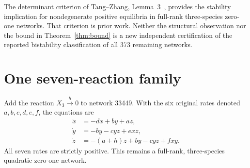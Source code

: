 \documentclass[11pt,a4paper]{article}
\begin{document}
The determinant criterion of Tang--Zhang, Lemma~3~\cite{TZ},
provides the stability implication for nondegenerate positive
equilibria in full-rank three-species zero-one networks. That
criterion is prior work. Neither the structural observation nor
the bound in Theorem~\ref{thm:bound} is a new independent
certification of the reported bistability classification of all
373 remaining networks.

\section{One seven-reaction family}\label{sec:seven}
Add the reaction $X_3\xrightarrow{h}0$ to network 33449. With
the six original rates denoted $a,b,c,d,e,f$, the equations are
\begin{equation}\label{eq:seven}
\begin{aligned}
 \dot x&=-dx+by+az,\\
 \dot y&=-by-cyz+exz,\\
 \dot z&=-(a+h)z+by-cyz+fxy.
\end{aligned}
\end{equation}
All seven rates are strictly positive. This remains a full-rank,
three-species quadratic zero-one network.
\end{document}
